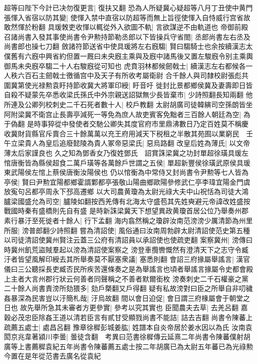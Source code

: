 超等曰陛下今計已决勿復更言|{
	復扶又翻}
恐為人所疑冀心疑超等八月丁丑使中黄門張惲入省宿以防其變|{
	使惲入禁中直宿以防超等而無上旨徑使惲入自恃威行宫省故敢然惲於粉翻}
具瑗敇吏收惲以輒從外入欲圖不軌|{
	言欲謀逆不由軌道也}
帝御前殿召諸尚書入發其事使尚書令尹勲持節勒丞郎以下皆操兵守省閤|{
	丞郎尚書左右丞及尚書郎也操七刀翻}
斂諸符節送省中使具瑗將左右廐騶|{
	賢曰騶騎士也余按續漢志太僕舊有六廐中興省約但置一厩曰未央廐主乘與及廐中諸馬後又置左駿廐令别主乘輿御馬未央廐卒騶二十人右駿廐從可知也}
虎賁羽林都候劒戟士|{
	續漢志左右都候各一人秩六百石主劒戟士徼循宫中及天子有所收考屬衛尉}
合千餘人與司隸校尉張彪共圍冀第使光禄勲袁盱持節收冀大將軍印綬|{
	盱音吁}
徙封比景都鄉侯冀及妻壽即日皆自殺不疑蒙先卒悉收梁氏孫氏中外宗親送詔獄無少長皆棄市|{
	少詩照翻長知兩翻}
他所連及公卿列校刺史二千石死者數十人|{
	校戶教翻}
太尉胡廣司徒韓縯司空孫朗皆坐阿附梁冀不衛宫止長壽亭減死一等免為庶人故吏賓客免黜者三百餘人朝廷為空|{
	為于偽翻}
是時事猝從中發使者交馳公卿失其度官府市里鼎沸數日乃定百姓莫不稱慶收冀財貨縣官斥賣合三十餘萬萬以充王府用減天下税租之半散其苑囿以業窮民　壬午立梁貴人為皇后追廢懿陵為貴人冢帝惡梁氏|{
	惡烏路翻}
改皇后姓為薄氏|{
	以文帝薄太后家謹良也}
久之知為鄧香女乃復姓鄧氏　詔賞誅梁冀之功封單超徐璜具瑗左悺唐衡皆為縣侯超食二萬戶璜等各萬餘戶世謂之五侯|{
	單超新豐侯徐璜武原侯具瑗東武陽侯左悺上蔡侯唐衡汝陽侯也}
仍以悺衡為中常侍又封尚書令尹勲等七人皆為亭侯|{
	賢曰尹勲宜陽都鄉霍諝鄴都亭張敬山陽曲鄉歐陽參修武仁亭李瑋宜陽金門虞放寃句呂都亭周永下邳高遷鄉}
以大司農黄瓊為太尉光祿大夫中山祝恬為司徒大鴻臚梁國盛允為司空|{
	臚陵如翻按西羌傳有北海太守盛苞其先姓奭避元帝諱改姓盛按戰國時秦有盛橋則先自有盛}
是時新誅梁冀天下想望異政黄瓊首居公位乃舉奏州郡素行暴汙至死徙者十餘人|{
	行下孟翻}
海内翕然稱之瓊辟汝南范滂滂少厲清節為州里所服|{
	滂普郎翻少詩照翻}
嘗為清詔使|{
	風俗通曰汝南周勃辟太尉清詔使范史第五種以司徒清詔使冀州賢注云蓋三公府有清詔員以承詔使也使疏吏翻}
案察冀州|{
	滂傳曰時冀州飢荒盜賊羣起以滂為清詔使案察之}
滂登車攬轡慨然有澄清天下之志守令臧汙者皆望風解印綬去其所舉奏莫不厭塞衆議|{
	塞悉則翻}
會詔三府掾屬舉謠言|{
	漢官儀曰三公聽採長吏臧否民所疾苦還條奏之是為舉謠言也頃者舉謠言掾屬令史都會殿上主者大言州郡行狀云何善者同聲稱之不善者默爾銜枚}
滂奏刺史二千石權豪之黨二十餘人尚書責滂所劾猥多|{
	劾戶槩翻又戶得翻}
疑有私故滂對曰臣之所舉自非叨穢姦暴深為民害豈以汙簡札哉|{
	汙烏故翻}
間以會日迫促|{
	會日謂三府椽屬會于朝堂之日也}
故先舉所急其未審者方更參實|{
	參考以究其實也}
臣聞農夫去草|{
	去羌呂翻}
嘉穀必茂忠臣除姦王道以清若臣言有貳甘受顯戮尚書不能詰|{
	詰去吉翻}
尚書令陳蕃上疏薦五處士|{
	處昌呂翻}
豫章徐穉彭城姜肱|{
	姓譜本自炎帝居於姜水因以為氏}
汝南袁閎京兆韋著潁川李曇|{
	曇徒含翻　考異曰范書徐穉傳云延熹二年尚書令陳蕃僕射胡廣等上書薦穉袁紀五年尚書令陳蕃薦五處士按二年胡廣已為太尉五年蕃已為光祿勲今置在是年從范書去廣名從袁紀}
